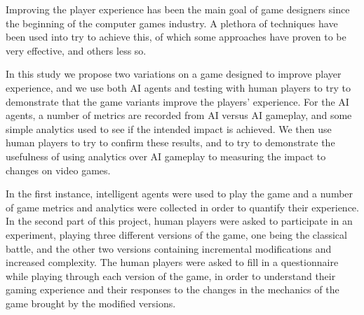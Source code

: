 Improving the player experience has been the main goal of game designers since the beginning of the computer games industry. A plethora of techniques have been used into try to achieve this, of which some approaches  have proven to be very effective, and others less so.

In this study we propose two variations on a game designed to improve player experience, and we use both AI agents and testing with human players to try to demonstrate that the game variants improve the players' experience. For the AI agents, a number of metrics are recorded from AI versus AI gameplay, and some simple analytics used to see if the intended impact is achieved. We then use human players to try to confirm these results, and to try to demonstrate the usefulness of using analytics over AI gameplay to measuring the impact to changes on video games.

In the first instance, intelligent agents were used to play the game and a number of game metrics and analytics were collected in order to quantify their experience. In the second part of this project, human players were asked to participate in an experiment, playing three different versions of the game, one being the classical battle, and the other two versions containing incremental modifications and increased complexity. The human players were asked to fill in a questionnaire while playing through each version of the game, in order to understand their gaming experience and their responses to the changes in the mechanics of the game brought by the modified versions.
